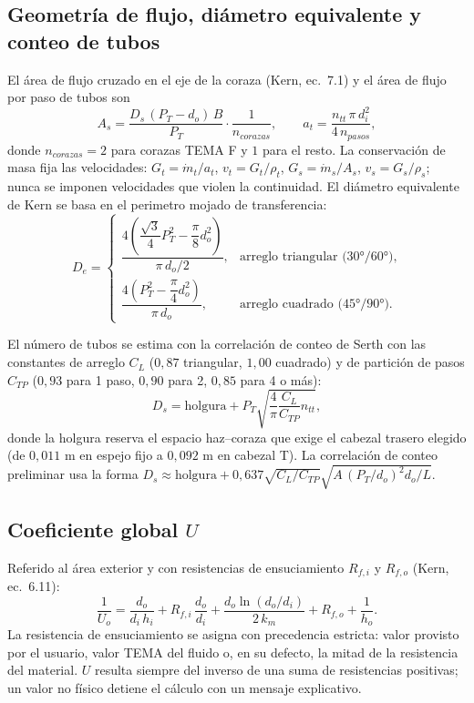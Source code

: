 \documentclass[11pt,a4paper]{article}
\begin{document}
\subsection{Geometr\'ia de flujo, di\'ametro equivalente y conteo de tubos}

El \'area de flujo cruzado en el eje de la coraza (Kern, ec.~7.1) y el \'area de
flujo por paso de tubos son
\begin{equation}
A_s = \frac{D_s \, (P_T - d_o) \, B}{P_T} \cdot \frac{1}{n_{corazas}},
\qquad
a_t = \frac{n_{tt} \, \pi \, d_i^2}{4 \, n_{pasos}},
\end{equation}
donde $n_{corazas} = 2$ para corazas TEMA F y $1$ para el resto. La
conservaci\'on de masa fija las velocidades: $G_t = \dot m_t / a_t$,
$v_t = G_t/\rho_t$, $G_s = \dot m_s / A_s$, $v_s = G_s/\rho_s$; nunca se imponen
velocidades que violen la continuidad. El di\'ametro equivalente de Kern se
basa en el perimetro mojado de transferencia:
\begin{equation}
D_e =
\begin{cases}
\dfrac{4\left(\dfrac{\sqrt{3}}{4}P_T^2 - \dfrac{\pi}{8}d_o^2\right)}
{\pi \, d_o / 2}, & \text{arreglo triangular (30°/60°)},\\[10pt]
\dfrac{4\left(P_T^2 - \dfrac{\pi}{4}d_o^2\right)}{\pi \, d_o}, &
\text{arreglo cuadrado (45°/90°)} .
\end{cases}
\end{equation}

El n\'umero de tubos se estima con la correlaci\'on de conteo de Serth
\cite{serth} con las constantes de arreglo $C_L$ ($0{,}87$ triangular, $1{,}00$
cuadrado) y de partici\'on de pasos $C_{TP}$ ($0{,}93$ para 1 paso, $0{,}90$
para 2, $0{,}85$ para 4 o m\'as):
\begin{equation}
D_s = \text{holgura} + P_T \sqrt{\frac{4}{\pi}\frac{C_L}{C_{TP}} n_{tt}} ,
\label{eq:ds}
\end{equation}
donde la holgura reserva el espacio haz--coraza que exige el cabezal trasero
elegido (de $0{,}011$ m en espejo fijo a $0{,}092$ m en cabezal T). La
correlaci\'on de conteo preliminar usa la forma
$D_s \approx \text{holgura} + 0{,}637\sqrt{C_L/C_{TP}}\sqrt{A\,(P_T/d_o)^2 d_o/L}$.

\subsection{Coeficiente global $U$}

Referido al \'area exterior y con resistencias de ensuciamiento $R_{f,i}$ y
$R_{f,o}$ (Kern, ec.~6.11):
\begin{equation}
\frac{1}{U_o} =
\frac{d_o}{d_i \, h_i}
+ R_{f,i}\,\frac{d_o}{d_i}
+ \frac{d_o \ln(d_o/d_i)}{2 \, k_m}
+ R_{f,o}
+ \frac{1}{h_o}.
\label{eq:u}
\end{equation}
La resistencia de ensuciamiento se asigna con precedencia estricta: valor
provisto por el usuario, valor TEMA del fluido o, en su defecto, la mitad de la
resistencia del material. $U$ resulta siempre del inverso de una suma de
resistencias positivas; un valor no f\'isico detiene el c\'alculo con un mensaje
explicativo.
\end{document}
